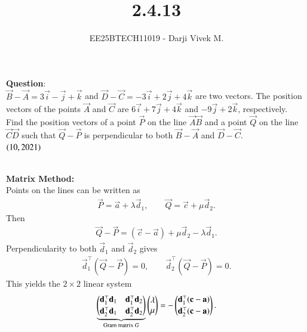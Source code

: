 \documentclass[journal]{IEEEtran}
\begin{document}


\title{2.4.13}
\author{EE25BTECH11019 - Darji Vivek M.}
{\let\newpage\relax\maketitle}

\renewcommand{\thefigure}{\theenumi}
\renewcommand{\thetable}{\theenumi}
\setlength{\intextsep}{10pt}
\renewcommand{\thetable}{\theenumi}

\textbf{Question}:\\
$\vec{B}-\vec{A}=3\vec{i}-\vec{j}+\vec{k}$ and $\vec{D}-\vec{C}=-3\vec{i}+2\vec{j}+4\vec{k}$ are two vectors.  
The position vectors of the points $\vec{A}$ and $\vec{C}$ are $6\vec{i}+7\vec{j}+4\vec{k}$ and $-9\vec{j}+2\vec{k}$, respectively.  
Find the position vectors of a point $\vec{P}$ on the line $\vec{A}\vec{B}$ and a point $\vec{Q}$ on the line $\vec{C}\vec{D}$ such that $\vec{Q}-\vec{P}$ is perpendicular to both $\vec{B}-\vec{A}$ and $\vec{D}-\vec{C}$.\\[4pt]
\hfill $\left(10,2021\right)$

\solution \\[-2mm]



\textbf{Matrix Method:}\\
Points on the lines can be written as
\begin{align}
\vec{P}=\vec{a}+\lambda\vec{d}_1,\qquad
\vec{Q}=\vec{c}+\mu\vec{d}_2.
\end{align}
Then
\begin{align}
\vec{Q}-\vec{P}
=(\vec{c}-\vec{a})+\mu\vec{d}_2-\lambda\vec{d}_1.
\end{align}
Perpendicularity to both $\vec{d}_1$ and $\vec{d}_2$ gives
\begin{align}
\vec{d}_1^{\top}(\vec{Q}-\vec{P})=0,\qquad
\vec{d}_2^{\top}(\vec{Q}-\vec{P})=0.
\end{align}
This yields the $2\times 2$ linear system
\begin{align}
\underbrace{\begin{pmatrix}\mathbf{d}_1^{\top}\mathbf{d}_1 & \mathbf{d}_1^{\top}\mathbf{d}_2\\[2pt]
\mathbf{d}_2^{\top}\mathbf{d}_1 & \mathbf{d}_2^{\top}\mathbf{d}_2\end{pmatrix}}_{\text{Gram matrix }G}
\begin{pmatrix}\lambda\\ \mu\end{pmatrix}
=
-\begin{pmatrix}\mathbf{d}_1^{\top}(\mathbf{c}-\mathbf{a})\\[2pt]
\mathbf{d}_2^{\top}(\mathbf{c}-\mathbf{a})\end{pmatrix}.
\label{eq:gram}
\end{align}
\end{document}

